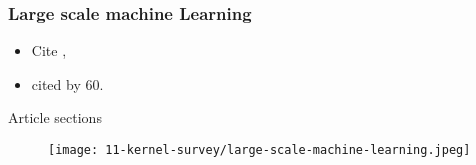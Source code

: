 \begin{frame}
    \frametitle{Large scale machine Learning}

    \begin{itemize}
        \item Cite \cite{wang2020survey},
        \item cited by 60. 
    \end{itemize}

\end{frame}

\begin{frame}{Article sections}
    \begin{figure}[t]
        \texttt{[image: 11-kernel-survey/large-scale-machine-learning.jpeg]}
        \centering
    \end{figure}


\end{frame}